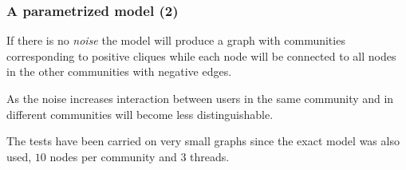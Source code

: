 \documentclass{beamer}
\begin{document}
\begin{frame}[c]
	\frametitle{A parametrized model (2)}

	If there is no \emph{noise} the model will produce a graph with communities
	corresponding to positive cliques while each node will be connected to
	all nodes in the other communities with negative edges.

	\bigskip

	As the noise increases interaction between users in the same community and
	in different communities will become less distinguishable.

	\bigskip

	The tests have been carried on very small graphs since the exact model was
	also used, $10$ nodes per community and $3$ threads.

\end{frame}
\end{document}
